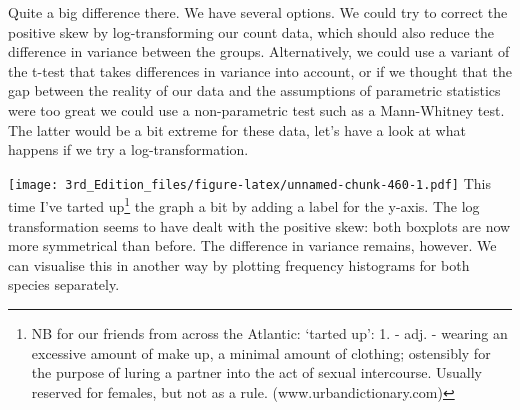 \documentclass[
]{book}
\newenvironment{Shaded}{\begin{snugshade}}{\end{snugshade}}
\newcommand{\DataTypeTok}[1]{\textcolor[rgb]{0.13,0.29,0.53}{#1}}
\newcommand{\KeywordTok}[1]{\textcolor[rgb]{0.13,0.29,0.53}{\textbf{#1}}}
\newcommand{\NormalTok}[1]{#1}
\newcommand{\OperatorTok}[1]{\textcolor[rgb]{0.81,0.36,0.00}{\textbf{#1}}}
\newcommand{\StringTok}[1]{\textcolor[rgb]{0.31,0.60,0.02}{#1}}
\begin{document}
Quite a big difference there. We have several options. We could try to correct the positive skew by log-transforming our count data, which should also reduce the difference in variance between the groups. Alternatively, we could use a variant of the t-test that takes differences in variance into account, or if we thought that the gap between the reality of our data and the assumptions of parametric statistics were too great we could use a non-parametric test such as a Mann-Whitney test. The latter would be a bit extreme for these data, let's have a look at what happens if we try a log-transformation.

\begin{Shaded}
\end{Shaded}

\texttt{[image: 3rd\_Edition\_files/figure-latex/unnamed-chunk-460-1.pdf]}
This time I've tarted up\footnote{NB for our friends from across the Atlantic: `tarted up': 1. - adj. - wearing an excessive amount of make up, a minimal amount of clothing; ostensibly for the purpose of luring a partner into the act of sexual intercourse. Usually reserved for females, but not as a rule. (www.urbandictionary.com)} the graph a bit by adding a label for the y-axis. The log transformation seems to have dealt with the positive skew: both boxplots are now more symmetrical than before. The difference in variance remains, however. We can visualise this in another way by plotting frequency histograms for both species separately.
\end{document}
